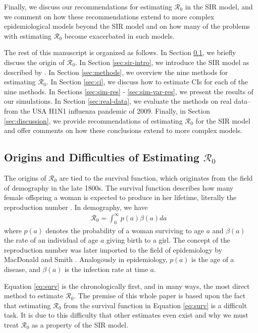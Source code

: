 \documentclass[12pt]{article}
\newcommand{\wxxsir}{nine } %
\newcommand{\rr}{\ensuremath{\mathcal{R}_0}}
\begin{document}
Finally, we discuss our recommendations for estimating $\rr$ in the SIR model, and we comment on how these recommendations extend to more complex epidemiological models beyond the SIR model and on how many of the problems with estimating $\rr$  become exacerbated in such models.


The rest of this manuscript is organized as follows.  In Section \ref{sec:r0}, we briefly discuss the origin of $\rr$.  In Section \ref{sec:sir-intro}, we introduce the SIR model as described by \cite{Kermack700}.  In Section \ref{sec:methods}, we overview the \wxxsir methods for estimating $\rr$. In Section \ref{sec:ci}, we discuss how to estimate CIs for each of the \wxxsir methods.  In Sections \ref{sec:sim-res} - \ref{sec:sim-var-res}, we present the results of our simulations.  In Section \ref{sec:real-data}, we evaluate the methods on real data--from the USA H1N1 influenza pandemic of 2009.  Finally, in Section \ref{sec:discussion}, we provide recommendations of estimating $\rr$ for the SIR model and offer comments on how these conclusions extend to more complex models.


\subsection{Origins and Difficulties of Estimating $\rr$}
\label{sec:r0}

The origins of $\rr$ are tied to the survival function, which originates from the field of demography in the late 1800s.  The survival function describes how many female offspring a woman is expected to produce in her lifetime, literally the reproduction number \citep{dietz1993estimation}.  In demography, we have
\begin{align}\label{eq:surv}
\rr = \int_0^\infty p(a) \beta(a) da
\end{align}
where $p(a)$ denotes the probability of a woman surviving to age $a$ and $\beta(a)$ the rate of an individual of age $a$ giving birth to a  girl.  The concept of the reproduction number was later imported to the field of epidemiology by MacDonald and Smith \citep{dietz1993estimation}.  Analogously in epidemiology, $p(a)$ is the age of a disease, and $\beta(a)$ is the infection rate at time $a$.

Equation \ref{eq:surv} is the chronologically first, and in many ways, the most direct method to estimate $\rr$.  The premise of this whole paper is based upon the fact that estimating $\rr$ from the survival function in Equation \eqref{eq:surv} is a difficult task.  It is due to this difficulty that other estimates even exist and why we must treat $\rr$ as a property of the SIR model.
\end{document}
